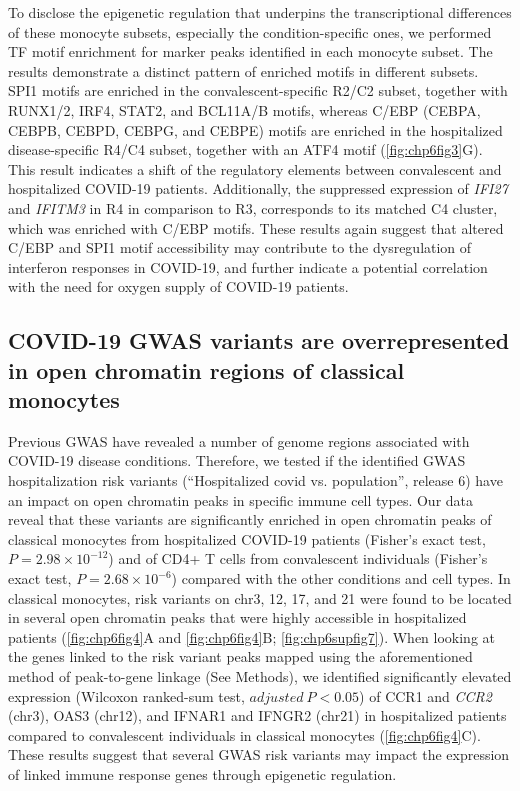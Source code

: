 \documentclass{book}
\begin{document}
\begin{refsection}
To disclose the epigenetic regulation that underpins the transcriptional differences of these monocyte subsets, especially the condition-specific ones, we performed TF motif enrichment for marker peaks identified in each monocyte subset.
The results demonstrate a distinct pattern of enriched motifs in different subsets.
SPI1 motifs are enriched in the convalescent-specific R2/C2 subset, together with RUNX1/2, IRF4, STAT2, and BCL11A/B motifs, whereas C/EBP (CEBPA, CEBPB, CEBPD, CEBPG, and CEBPE) motifs are enriched in the hospitalized disease-specific R4/C4 subset, together with an ATF4 motif (\ref{fig:chp6fig3}G).
This result indicates a shift of the regulatory elements between convalescent and hospitalized COVID-19 patients.
Additionally, the suppressed expression of \textit{IFI27} and \textit{IFITM3} in R4 in comparison to R3, corresponds to its matched C4 cluster, which was enriched with C/EBP motifs.
These results again suggest that altered C/EBP and SPI1 motif accessibility may contribute to the dysregulation of interferon responses in COVID-19, and further indicate a potential correlation with the need for oxygen supply of COVID-19 patients. %

\subsection*{COVID-19 GWAS variants are overrepresented in open chromatin regions of classical monocytes}
Previous GWAS have revealed a number of genome regions associated with COVID-19 disease conditions.
Therefore, we tested if the identified GWAS hospitalization risk variants (\enquote{Hospitalized covid vs. population}, release 6) \cite{Niemi2021Mapping} have an impact on open chromatin peaks in specific immune cell types.
Our data reveal that these variants are significantly enriched in open chromatin peaks of classical monocytes from hospitalized COVID-19 patients (Fisher’s exact test, $P = 2.98 \times 10^{-12}$) and of CD4+ T cells from convalescent individuals (Fisher’s exact test, $P = 2.68 \times 10^{-6}$) compared with the other conditions and cell types.
In classical monocytes, risk variants on chr3, 12, 17, and 21 were found to be located in several open chromatin peaks that were highly accessible in hospitalized patients (\ref{fig:chp6fig4}A and \ref{fig:chp6fig4}B; \ref{fig:chp6supfig7}).
When looking at the genes linked to the risk variant peaks mapped using the aforementioned method of peak-to-gene linkage (See Methods), we identified significantly elevated expression (Wilcoxon ranked-sum test, $adjusted~P < 0.05$) of CCR1 and \textit{CCR2} (chr3), OAS3 (chr12), and IFNAR1 and IFNGR2 (chr21) in hospitalized patients compared to convalescent individuals in classical monocytes (\ref{fig:chp6fig4}C).
These results suggest that several GWAS risk variants may impact the expression of linked immune response genes through epigenetic regulation.


\end{refsection}
\end{document}
